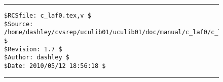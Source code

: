%
%
%
%
%
%
%
\noindent\begin{figure}[!b]
\noindent\rule[-0.25in]{\textwidth}{1pt}
\begin{tiny}
\begin{verbatim}
$RCSfile: c_laf0.tex,v $
$Source: /home/dashley/cvsrep/uculib01/uculib01/doc/manual/c_laf0/c_laf0.tex,v $
$Revision: 1.7 $
$Author: dashley $
$Date: 2010/05/12 18:56:18 $
\end{verbatim}
\end{tiny}
\noindent\rule[0.25in]{\textwidth}{1pt}
\end{figure}

